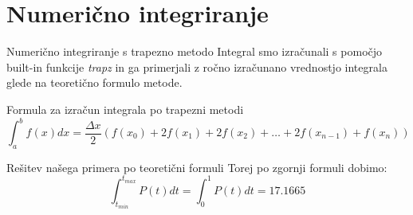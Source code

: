 \documentclass[11pt, aspectration=169]{beamer}
\begin{document}
\section{Numerično integriranje}
\begin{frame}{Numerično integriranje s trapezno metodo}
Integral smo izračunali s pomočjo built-in funkcije \textit{trapz} in ga primerjali z ročno izračunano vrednostjo integrala glede na teoretično formulo metode.
\begin{block}{Formula za izračun integrala po trapezni metodi}
\small
\[
\int_{a}^{b} f(x) dx = \frac{\Delta x}{2} \left( f(x_0) + 2f(x_1) + 2f(x_2) + \dots + 2f(x_{n-1}) + f(x_n) \right)
\]
\end{block}
\begin{block}{Rešitev našega primera po teoretični formuli}
Torej po zgornji formuli dobimo: 
\[
\int_{t_{min}}^{t_{max}} P(t) dt = \int_{0}^{1} P(t) dt = 17.1665
\]
\end{block}

\end{frame}
\end{document}
